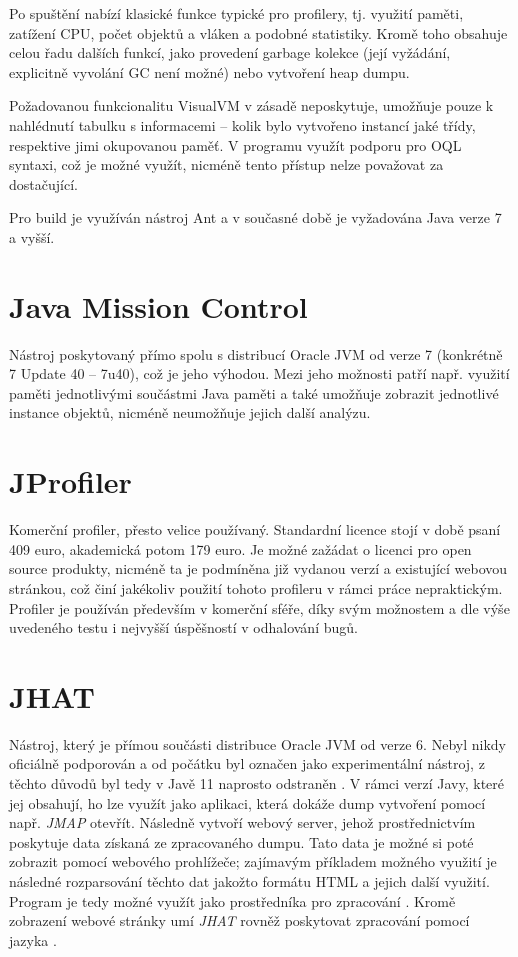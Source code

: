 Po spuštění nabízí klasické funkce typické pro profilery, tj. využití paměti, zatížení CPU, počet objektů a vláken a podobné statistiky. Kromě toho obsahuje celou řadu dalších funkcí, jako provedení garbage kolekce (její vyžádání, explicitně vyvolání GC není možné) nebo vytvoření heap dumpu.

Požadovanou funkcionalitu VisualVM v zásadě neposkytuje, umožňuje pouze k nahlédnutí tabulku s informacemi – kolik bylo vytvořeno instancí jaké třídy, respektive jimi okupovanou paměť. V programu využít podporu pro OQL syntaxi, což je možné využít, nicméně tento přístup nelze považovat za dostačující.

Pro build je využíván nástroj Ant a v současné době je vyžadována Java verze 7 a vyšší.

\section{Java Mission Control}
Nástroj poskytovaný přímo spolu s distribucí Oracle JVM od verze 7 (konkrétně 7 Update 40 – 7u40), což je jeho výhodou. Mezi jeho možnosti patří např. využití paměti jednotlivými součástmi Java paměti a také umožňuje zobrazit jednotlivé instance objektů, nicméně neumožňuje jejich další analýzu.

\section{JProfiler}
Komerční profiler, přesto velice používaný. Standardní licence stojí v době psaní 409 euro, akademická potom 179 euro. Je možné zažádat o licenci pro open source produkty, nicméně ta je podmíněna již vydanou verzí a existující webovou stránkou, což činí jakékoliv použití tohoto profileru v rámci práce nepraktickým. Profiler je používán především v komerční sféře, díky svým možnostem a dle výše uvedeného testu i nejvyšší úspěšností v odhalování bugů.

\section{JHAT}
Nástroj, který je přímou součásti distribuce Oracle JVM od verze 6. Nebyl nikdy oficiálně podporován a od počátku byl označen jako experimentální nástroj, z těchto důvodů byl tedy v Javě 11 naprosto odstraněn \cite{jep241}\cite{java11migration}. V rámci verzí Javy, které jej obsahují, ho lze využít jako  aplikaci, která dokáže dump vytvoření pomocí např. \textit{JMAP} otevřít. Následně vytvoří webový server, jehož prostřednictvím poskytuje data získaná ze zpracovaného dumpu. Tato data je možné si poté zobrazit pomocí webového prohlížeče; zajímavým příkladem možného využití je následné rozparsování těchto dat jakožto formátu HTML a jejich další využití. Program je tedy možné využít jako prostředníka pro zpracování \cite{jhat}. Kromě  zobrazení webové stránky umí \textit{JHAT} rovněž poskytovat zpracování pomocí jazyka .


